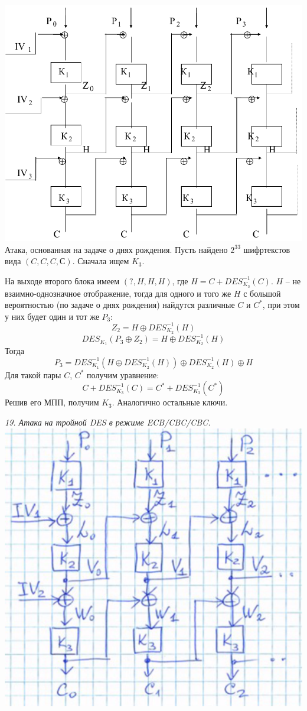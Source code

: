\includegraphics[scale=.4]{eka/img/CBC_CBC_CBC.png} \\

Атака, основанная на задаче о днях рождения. Пусть найдено $2^33$ шифртекстов вида $(C, C, C, С)$. Сначала ищем $K_3$.

На выходе второго блока имеем $(?, H, H, H)$, где $H = C + DES_{K_3}^{-1}(C)$. $H$ -- не взаимно-однозначное отображение, тогда для одного и того же $H$ с большой вероятностью (по задаче о днях рождения) найдутся различные $C$ и $C^*$, при этом у них будет один и тот же $P_3$:
$$Z_2 = H \oplus DES_{K_2}^{-1}(H)$$
$$DES_{K_1}(P_3 \oplus Z_2) = H \oplus DES_{K_2}^{-1}(H)$$
Тогда
$$P_3 = DES_{K_1}^{-1}(H \oplus DES_{K_2}^{-1}(H)) \oplus DES_{K_2}^{-1}(H) \oplus H$$
Для такой пары $C$, $C^*$ получим уравнение:
$$C + DES_{K_3}^{-1}(C) = C^* + DES_{K_3}^{-1}(C^*)$$
Решив его МПП, получим $K_3$. Аналогично остальные ключи.

\newpage
\noindent \textit{19. Атака на тройной DES в режиме ECB/CBC/CBC.} \\

\includegraphics[scale=.5]{eka/img/ECB_CBC_CBC.png} \\

